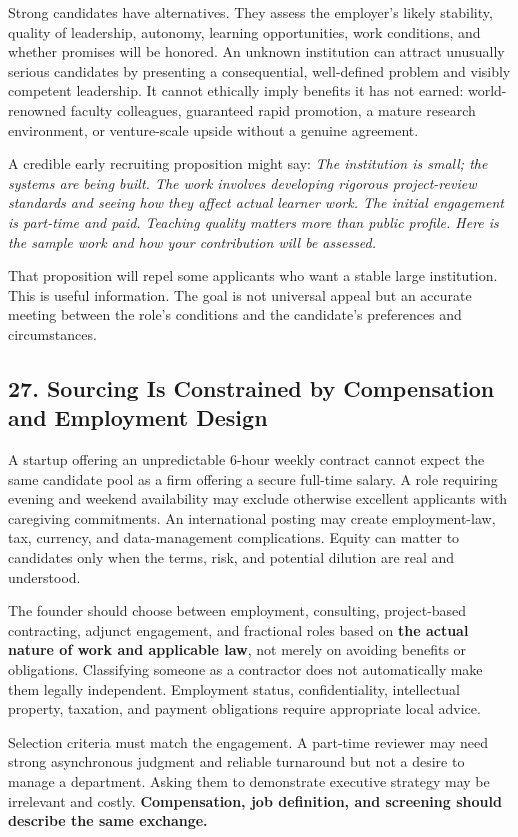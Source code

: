 Strong candidates have alternatives. They assess the employer's likely stability, quality of leadership, autonomy, learning opportunities, work conditions, and whether promises will be honored. An unknown institution can attract unusually serious candidates by presenting a consequential, well-defined problem and visibly competent leadership. It cannot ethically imply benefits it has not earned: world-renowned faculty colleagues, guaranteed rapid promotion, a mature research environment, or venture-scale upside without a genuine agreement.

A credible early recruiting proposition might say: \textit{The institution is small; the systems are being built. The work involves developing rigorous project-review standards and seeing how they affect actual learner work. The initial engagement is part-time and paid. Teaching quality matters more than public profile. Here is the sample work and how your contribution will be assessed.}

That proposition will repel some applicants who want a stable large institution. This is useful information. The goal is not universal appeal but an accurate meeting between the role's conditions and the candidate's preferences and circumstances.

\subsection*{27. Sourcing Is Constrained by Compensation and Employment Design}

A startup offering an unpredictable 6-hour weekly contract cannot expect the same candidate pool as a firm offering a secure full-time salary. A role requiring evening and weekend availability may exclude otherwise excellent applicants with caregiving commitments. An international posting may create employment-law, tax, currency, and data-management complications. Equity can matter to candidates only when the terms, risk, and potential dilution are real and understood.

The founder should choose between employment, consulting, project-based contracting, adjunct engagement, and fractional roles based on \textbf{the actual nature of work and applicable law}, not merely on avoiding benefits or obligations. Classifying someone as a contractor does not automatically make them legally independent. Employment status, confidentiality, intellectual property, taxation, and payment obligations require appropriate local advice.

Selection criteria must match the engagement. A part-time reviewer may need strong asynchronous judgment and reliable turnaround but not a desire to manage a department. Asking them to demonstrate executive strategy may be irrelevant and costly. \textbf{Compensation, job definition, and screening should describe the same exchange.}
